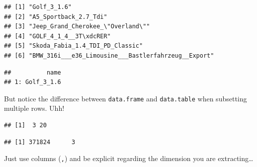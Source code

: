 \documentclass[]{book}
\newenvironment{Shaded}{\begin{snugshade}}{\end{snugshade}}
\newcommand{\KeywordTok}[1]{\textcolor[rgb]{0.13,0.29,0.53}{\textbf{#1}}}
\newcommand{\DecValTok}[1]{\textcolor[rgb]{0.00,0.00,0.81}{#1}}
\newcommand{\StringTok}[1]{\textcolor[rgb]{0.31,0.60,0.02}{#1}}
\newcommand{\CommentTok}[1]{\textcolor[rgb]{0.56,0.35,0.01}{\textit{#1}}}
\newcommand{\OperatorTok}[1]{\textcolor[rgb]{0.81,0.36,0.00}{\textbf{#1}}}
\newcommand{\NormalTok}[1]{#1}
\theoremstyle{definition}
\theoremstyle{definition}
\theoremstyle{definition}
\theoremstyle{remark}
\begin{document}
\begin{verbatim}
## [1] "Golf_3_1.6"                                        
## [2] "A5_Sportback_2.7_Tdi"                              
## [3] "Jeep_Grand_Cherokee_\"Overland\""                  
## [4] "GOLF_4_1_4__3T\xdcRER"                             
## [5] "Skoda_Fabia_1.4_TDI_PD_Classic"                    
## [6] "BMW_316i___e36_Limousine___Bastlerfahrzeug__Export"
\end{verbatim}

\begin{Shaded}
\end{Shaded}

\begin{verbatim}
##          name
## 1: Golf_3_1.6
\end{verbatim}

But notice the difference between \texttt{data.frame} and
\texttt{data.table} when subsetting multiple rows. Uhh!

\begin{Shaded}
\end{Shaded}

\begin{verbatim}
## [1]  3 20
\end{verbatim}

\begin{Shaded}
\end{Shaded}

\begin{verbatim}
## [1] 371824      3
\end{verbatim}

Just use columns (\texttt{,}) and be explicit regarding the dimension
you are extracting\ldots{}
\end{document}

